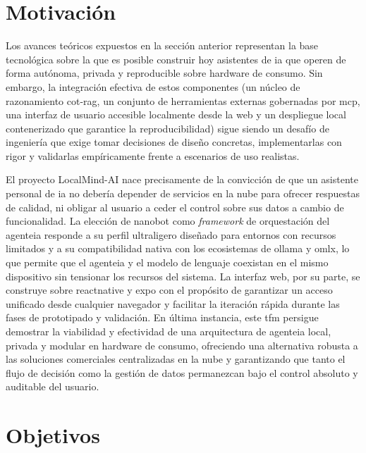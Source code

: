\section{Motivación}
\label{sec:motivacion}

Los avances teóricos expuestos en la sección anterior representan la base tecnológica sobre la que es posible construir hoy asistentes de \gls{ia} que operen de forma autónoma, privada y reproducible sobre \gls{hardware} de consumo. Sin embargo, la integración efectiva de estos componentes (un núcleo de razonamiento \gls{cot}-\gls{rag}, un conjunto de herramientas externas gobernadas por \gls{mcp}, una interfaz de usuario accesible localmente desde la web y un despliegue local contenerizado que garantice la reproducibilidad) sigue siendo un desafío de ingeniería que exige tomar decisiones de diseño concretas, implementarlas con rigor y validarlas empíricamente frente a escenarios de uso realistas.

El proyecto LocalMind-AI nace precisamente de la convicción de que un asistente personal de \gls{ia} no debería depender de servicios en la nube para ofrecer respuestas de calidad, ni obligar al usuario a ceder el control sobre sus datos a cambio de funcionalidad. La elección de \gls{nanobot} como \textit{framework} de orquestación del \gls{agenteia} responde a su perfil ultraligero diseñado para entornos con recursos limitados y a su compatibilidad nativa con los ecosistemas de \gls{ollama} y \gls{omlx}, lo que permite que el \gls{agenteia} y el modelo de lenguaje coexistan en el mismo dispositivo sin tensionar los recursos del sistema. La interfaz web, por su parte, se construye sobre \gls{reactnative} \cite{meta2024reactnative} y \gls{expo} \cite{expo2024} con el propósito de garantizar un acceso unificado desde cualquier navegador y facilitar la iteración rápida durante las fases de prototipado y validación. En última instancia, este \gls{tfm} persigue demostrar la viabilidad y efectividad de una arquitectura de \gls{agenteia} local, privada y modular en \gls{hardware} de consumo, ofreciendo una alternativa robusta a las soluciones comerciales centralizadas en la nube y garantizando que tanto el flujo de decisión como la gestión de datos permanezcan bajo el control absoluto y auditable del usuario.

\section{Objetivos}
\label{sec:objetivos}

